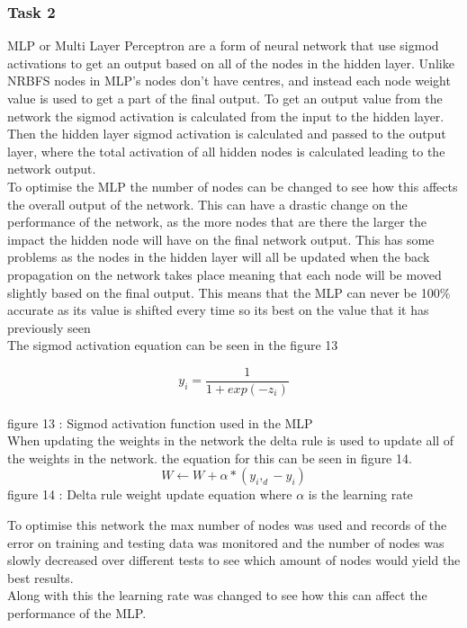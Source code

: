 \documentclass{IEEEtran}[11pt]
\begin{document}
\subsubsection{Task 2}
\begin{flushleft}
  MLP or Multi Layer Perceptron are a form of neural network that use sigmod activations
  to get an output based on all of the nodes in the hidden layer. Unlike NRBFS nodes in
  MLP's nodes don't have centres, and instead each node weight value is used to get a
  part of the final output. To get an output value from the network the sigmod activation
  is calculated from the input to the hidden layer. Then the hidden layer sigmod activation
  is calculated and passed to the output layer, where the total activation of all hidden
  nodes is calculated leading to the network output.
  \\
  \vspace{1.5mm}
  To optimise the MLP the number of nodes can be changed to see how this affects the overall
  output of the network. This can have a drastic change on the performance of the network, as
  the more nodes that are there the larger the impact the hidden node will have on the final
  network output. This has some problems as the nodes in the hidden layer will all be updated
  when the back propagation on the network takes place meaning that each node will be moved
  slightly based on the final output. This means that the MLP can never be 100\% accurate
  as its value is shifted every time so its best on the value that it has previously seen
  \\
  \vspace{1.5mm}
  The sigmod activation equation can be seen in the figure 13

$$y_i=\frac{1}{1+exp(-z_i)}$$
\\
\vspace{1.5mm}
{\footnotesize figure 13 : Sigmod activation function used in the MLP}
\\
\vspace{1.5mm}
When updating the weights in the network the delta rule is used to update all of
the weights in the network. the equation for this can be seen in figure 14.
$$W \leftarrow W  + \alpha*(y_i,_d - y_i)$$
{\footnotesize figure 14 : Delta rule weight update equation where $\alpha$ is the learning
rate}
\\
\vspace{1.5mm}

To optimise this network the max number of nodes was used and records of the error on training
and testing data was monitored and the number of nodes was slowly decreased over different tests
to see which amount of nodes would yield the best results.
\\
\vspace{1.5mm}
Along with this the learning rate was changed to see how this can affect the performance of the MLP.


\end{flushleft}
\end{document}
